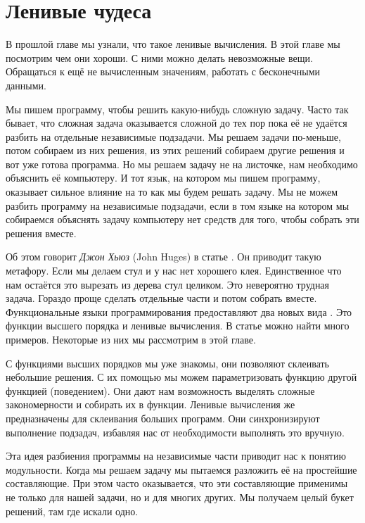 \setcounter{chapter}{8}
\chapter{Ленивые чудеса}

В прошлой главе мы узнали, что такое ленивые вычисления. 
В этой главе мы посмотрим чем они хороши. С ними можно
делать невозможные вещи. Обращаться к ещё не вычисленным
значениям, работать с бесконечными данными.

Мы пишем программу, чтобы решить какую-нибудь сложную задачу.
Часто так бывает, что сложная задача оказывается сложной до тех
пор пока её не удаётся разбить на отдельные независимые
подзадачи. Мы решаем задачи по-меньше, потом собираем из
них решения, из этих решений собираем другие решения и
вот уже готова программа. Но мы решаем задачу не на листочке,
нам необходимо объяснить её компьютеру. И тот язык, на 
котором мы пишем программу, оказывает сильное влияние на то
как мы будем решать задачу. Мы не можем разбить программу
на независимые подзадачи, если в том языке на котором мы собираемся
объяснять задачу компьютеру нет средств для того, чтобы 
собрать эти решения вместе. 

Об этом говорит \emph{Джон Хьюз} (John Huges) в статье
. Он приводит
такую метафору. Если мы делаем стул и у нас нет хорошего клея.
Единственное что нам остаётся это вырезать из дерева стул 
целиком. Это невероятно трудная задача. Гораздо проще 
сделать отдельные части и потом собрать вместе. 
Функциональные языки программирования предоставляют 
два новых вида . Это функции высшего порядка 
и ленивые вычисления. В статье можно найти много 
примеров. Некоторые из них мы рассмотрим в этой главе.

С функциями высших порядков мы уже знакомы, они позволяют
склеивать небольшие решения. С их помощью мы можем параметризовать 
функцию другой функцией (поведением). Они дают нам возможность
выделять сложные закономерности и собирать их в функции.
Ленивые вычисления же предназначены для склеивания больших
программ. Они синхронизируют выполнение подзадач, избавляя
нас от необходимости выполнять это вручную.

Эта идея разбиения программы на независимые части приводит 
нас к понятию модульности. Когда мы решаем задачу мы 
пытаемся разложить её на простейшие составляющие. 
При этом часто оказывается, что эти составляющие применимы
не только для нашей задачи, но и для многих других. 
Мы получаем целый букет решений, там где искали одно.

